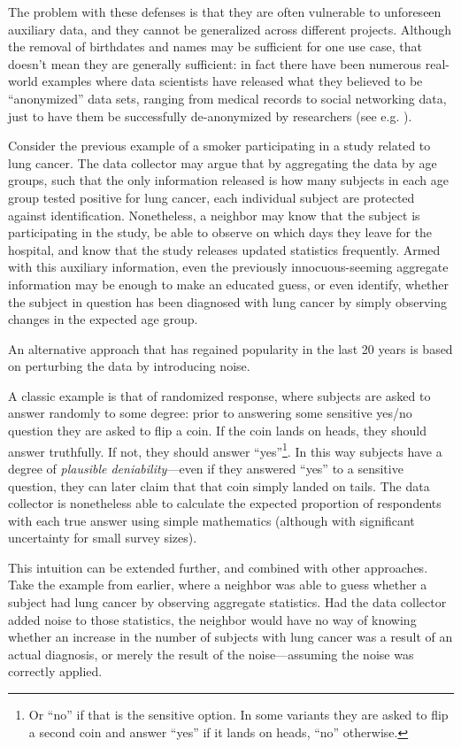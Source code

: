 \documentclass[12pt]{article}
\begin{document}
The problem with these defenses is that they are often vulnerable to unforeseen auxiliary data, and they cannot be generalized across different projects. Although the removal of birthdates and names may be sufficient for one use case, that doesn't mean they are generally sufficient: in fact there have been numerous real-world examples where data scientists have released what they believed to be ``anonymized'' data sets, ranging from medical records to social networking data, just to have them be successfully de-anonymized by researchers (see e.g. \cite{reidentification2011}).

Consider the previous example of a smoker participating in a study related to lung cancer. The data collector may argue that by aggregating the data by age groups, such that the only information released is how many subjects in each age group tested positive for lung cancer, each individual subject are protected against identification. Nonetheless, a neighbor may know that the subject is participating in the study, be able to observe on which days they leave for the hospital, and know that the study releases updated statistics frequently. Armed with this auxiliary information, even the previously innocuous-seeming aggregate information may be enough to make an educated guess, or even identify, whether the subject in question has been diagnosed with lung cancer by simply observing changes in the expected age group. \bigskip

An alternative approach that has regained popularity in the last 20 years is based on perturbing the data by introducing noise.

A classic example is that of randomized response, where subjects are asked to answer randomly to some degree: prior to answering some sensitive yes/no question they are asked to flip a coin. If the coin lands on heads, they should answer truthfully. If not, they should answer ``yes''\footnote{Or ``no'' if that is the sensitive option. In some variants they are asked to flip a second coin and answer ``yes'' if it lands on heads, ``no'' otherwise.}. In this way subjects have a degree of \emph{plausible deniability}---even if they answered ``yes'' to a sensitive question, they can later claim that that coin simply landed on tails. The data collector is nonetheless able to calculate the expected proportion of respondents with each true answer using simple mathematics (although with significant uncertainty for small survey sizes).

This intuition can be extended further, and combined with other approaches. Take the example from earlier, where a neighbor was able to guess whether a subject had lung cancer by observing aggregate statistics. Had the data collector added noise to those statistics, the neighbor would have no way of knowing whether an increase in the number of subjects with lung cancer was a result of an actual diagnosis, or merely the result of the noise---assuming the noise was correctly applied. \bigskip
\end{document}
